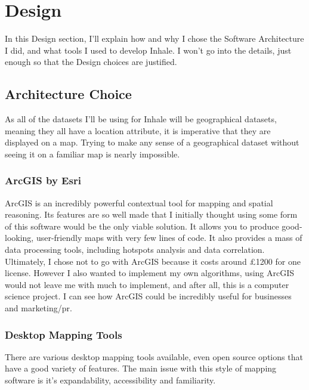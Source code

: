 \chapter{Design}
In this Design section, I'll explain how and why I chose the Software Architecture I did, and what tools I used to develop Inhale. I won't go into the details, just enough so that the Design choices are justified.

\section{Architecture Choice}

As all of the datasets I'll be using for Inhale will be geographical datasets, meaning they all have a location attribute, it is imperative that they are displayed on a map. Trying to make any sense of a geographical dataset without seeing it on a familiar map is nearly impossible.\\



\subsection{ArcGIS by Esri}

ArcGIS is an incredibly powerful contextual tool for mapping and spatial reasoning. Its features are so well made that I initially thought using some form of this software would be the only viable solution. It allows you to produce good-looking, user-friendly maps with very few lines of code. It  also provides a mass of data processing tools, including hotspots analysis and data correlation.\\

Ultimately, I chose not to go with ArcGIS because it costs around £1200 for one license. However I also wanted to implement my own algorithms, using ArcGIS would not leave me with much to implement, and after all, this is a computer science project. I can see how ArcGIS could be incredibly useful for businesses and marketing/pr.

\subsection{Desktop Mapping Tools}

There are various desktop mapping tools available, even open source options that have a good variety of features. The main issue with this style of mapping software is it's expandability, accessibility and familiarity.\\

